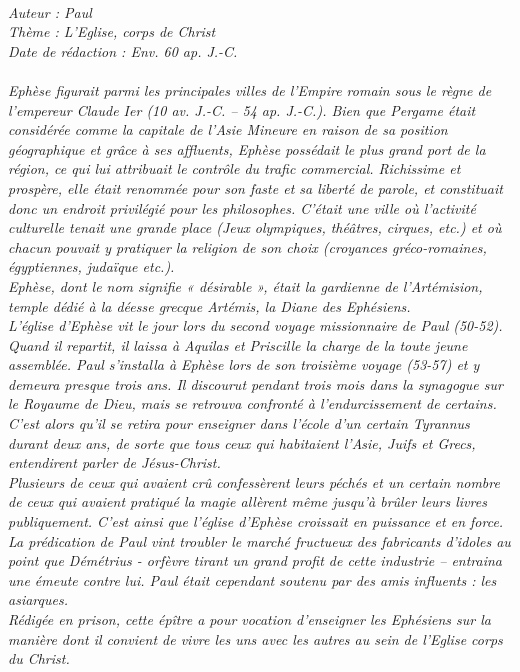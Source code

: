 \BFont
\noindent\hrulefill
{\footnotesize
\textit{
\bigskip
{\centering{}
\\Auteur : Paul
\\Thème : L'Eglise, corps de Christ
\\Date de rédaction : Env. 60 ap. J.-C.\\}
}
\textit{
\\Ephèse figurait parmi les principales villes de l'Empire romain sous le règne de l'empereur Claude Ier (10 av. J.-C. – 54 ap. J.-C.). Bien que Pergame était considérée comme la capitale de l'Asie Mineure en raison de sa position géographique et grâce à ses affluents, Ephèse possédait le plus grand port de la région, ce qui lui attribuait le contrôle du trafic commercial. Richissime et prospère, elle était renommée pour son faste et sa liberté de parole, et constituait donc un endroit privilégié pour les philosophes. C'était une ville où l'activité culturelle tenait une grande place (Jeux olympiques, théâtres, cirques, etc.) et où chacun pouvait y pratiquer la religion de son choix (croyances gréco-romaines, égyptiennes, judaïque etc.).
\\Ephèse, dont le nom signifie « désirable », était la gardienne de l'Artémision, temple dédié à la déesse grecque Artémis,
la Diane des Ephésiens.
\\L'église d'Ephèse vit le jour lors du second voyage missionnaire de Paul (50-52). Quand il repartit, il laissa à Aquilas et Priscille la charge de la toute jeune assemblée. Paul s'installa à Ephèse lors de son troisième voyage (53-57) et y demeura presque trois ans. Il discourut pendant trois mois dans la synagogue sur le Royaume de Dieu, mais se retrouva confronté à l'endurcissement de certains. C'est alors qu'il se retira pour enseigner dans l'école d'un certain Tyrannus durant deux ans, de sorte que tous ceux qui habitaient l'Asie, Juifs et Grecs, entendirent parler de Jésus-Christ.
\\Plusieurs de ceux qui avaient crû confessèrent leurs péchés et un certain nombre de ceux qui avaient pratiqué la magie allèrent même jusqu'à brûler leurs livres publiquement. C'est ainsi que l'église d'Ephèse croissait en puissance et en force. La prédication de Paul vint troubler le marché fructueux des fabricants d'idoles au point que Démétrius - orfèvre tirant un grand profit de cette industrie – entraina une émeute contre lui. Paul était cependant soutenu par des amis influents : les asiarques.
\\Rédigée en prison, cette épître a pour vocation d'enseigner les Ephésiens sur la manière dont il convient de vivre les uns avec les autres au sein de l'Eglise corps du Christ.\bigskip
}
}
